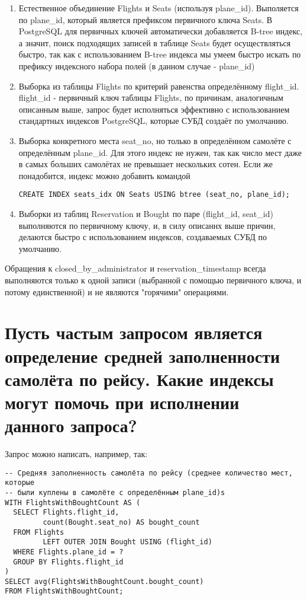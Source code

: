 \documentclass{article}
\begin{document}
\begin{enumerate}
\item Естественное объединение Flights и Seats (используя plane\_id). Выполяется по plane\_id, который является префиксом первичного ключа Seats. В PostgreSQL для первичных ключей автоматически добавляется B-tree индекс, а значит, поиск подходящих записей в таблице Seats будет осуществляться быстро, так как с использованием B-tree индекса мы умеем быстро искать по префиксу индексного набора полей (в данном случае - plane\_id)

\item Выборка из таблицы Flights по критерий равенства определённому flight\_id. flight\_id - первичный ключ таблицы Flights, по причинам, аналогичным описанным выше, запрос будет исполняться эффективно с использованием стандартных индексов PostgreSQL, которые СУБД создаёт по умолчанию.

\item Выборка конкретного места seat\_no, но только в определённом самолёте с определённым plane\_id. Для этого индекс не нужен, так как число мест даже в самых больших самолётах не превышает нескольких сотен. Если же понадобится, индекс можно добавить командой 

\begin{verbatim}
CREATE INDEX seats_idx ON Seats USING btree (seat_no, plane_id);
\end{verbatim}

\item Выборки из таблиц Reservation и Bought по паре (flight\_id, seat\_id) выполняются по первичному ключу, и, в силу описаннх выше причин, делаются быстро с использованием индексов, создаваемых СУБД по умолчанию.
\end{enumerate}

Обращения к closed\_by\_administrator и reservation\_timestamp всегда выполняются только к одной записи (выбранной с помощью первичного ключа, и потому единственной) и не являются "горячими" операциями.

\section{Пусть частым запросом является определение средней заполненности самолёта по рейсу. Какие индексы могут помочь при исполнении данного запроса?}

Запрос можно написать, например, так:

\begin{verbatim}
-- Средняя заполненность самолёта по рейсу (среднее количество мест, которые
-- были куплены в самолёте с определённым plane_id)s
WITH FlightsWithBoughtCount AS (
  SELECT Flights.flight_id,
         count(Bought.seat_no) AS bought_count
  FROM Flights
         LEFT OUTER JOIN Bought USING (flight_id)
  WHERE Flights.plane_id = ?
  GROUP BY Flights.flight_id
)
SELECT avg(FlightsWithBoughtCount.bought_count)
FROM FlightsWithBoughtCount;
\end{verbatim}
\end{document}
